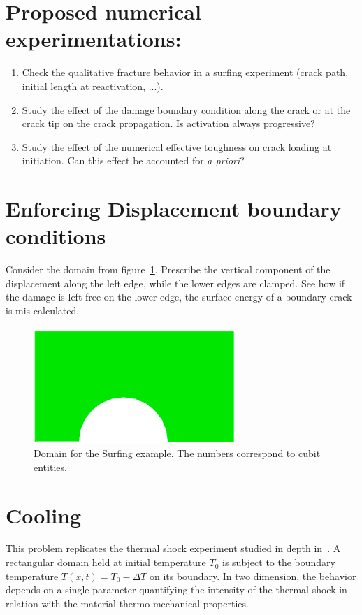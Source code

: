 \documentclass[10pt,oneside]{memoir}
\begin{document}
\section*{Proposed numerical experimentations:}
\begin{enumerate}
\item Check the qualitative fracture behavior in a surfing experiment (crack path, initial length at reactivation, ...).
\item Study the effect of the damage boundary condition along the crack or at the crack tip on the crack propagation. Is activation always progressive?
\item Study the effect of the numerical effective toughness on crack loading at initiation. Can this effect be accounted for \emph{a priori}?
\end{enumerate}

\section{Enforcing Displacement boundary conditions}
Consider the domain from figure~\ref{fig:BC}. Prescribe the vertical component of the displacement along the left edge, while the lower edges are clamped. See how if the damage is left free on the lower edge, the surface energy of a boundary crack is mis-calculated.
\begin{figure}[H]
\centering
\includegraphics[width=.45\textwidth]{Examples/BC/Geometry.png}
\caption{Domain for the Surfing example. The numbers correspond to cubit entities.}
\label{fig:BC}
\end{figure}



\section{Cooling}
This problem replicates the thermal shock experiment studied in depth in~\cite{Sicsic-Marigo-2013a,Bourdin-Marigo-EtAl-2014a}. A rectangular domain held at initial temperature $T_0$ is subject to the boundary temperature $T(x,t) = T_0 - \Delta T$ on its boundary. In two dimension, the behavior depends on a single parameter quantifying the intensity of the thermal shock in relation with the material thermo-mechanical properties.
\end{document}
